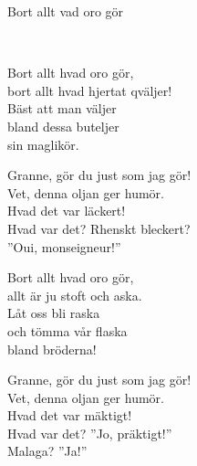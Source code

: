 \begin{song}{Bort allt vad oro gör}	
	
	
	\\
	
	Bort allt hvad oro gör,\\
	bort allt hvad hjertat qväljer!\\
	Bäst att man väljer\\
	bland dessa buteljer\\
	sin maglikör.\\
	\begin{repetition}
		Granne, gör du just som jag gör!\\
		Vet, denna oljan ger humör.\\
		Hvad det var läckert!\\
		Hvad var det? Rhenskt bleckert?\\
		''Oui, monseigneur!''
	\end{repetition}
	
	Bort allt hvad oro gör,\\
	allt är ju stoft och aska.\\
	Låt oss bli raska\\
	och tömma vår flaska\\
	bland bröderna!\\
	\begin{repetition}
		Granne, gör du just som jag gör!\\
		Vet, denna oljan ger humör.\\
		Hvad det var mäktigt!\\
		Hvad var det? ''Jo, präktigt!''\\
		Malaga? ''Ja!''
	\end{repetition}
	

\end{song}
